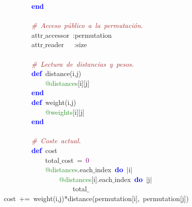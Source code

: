 \mbox{}\ \ \ \ \ \ \ \ \textbf{\textcolor{Blue}{end}} \\
\mbox{} \\
\mbox{}\ \ \ \ \ \ \ \ \textit{\textcolor{Brown}{\#\ Acceso\ público\ a\ la\ permutación.}} \\
\mbox{}\ \ \ \ \ \ \ \ attr$\_$accessor\ \textcolor{BrickRed}{:}permutation\  \\
\mbox{}\ \ \ \ \ \ \ \ attr$\_$reader\ \ \ \textcolor{BrickRed}{:}size \\
\mbox{} \\
\mbox{}\ \ \ \ \ \ \ \ \textit{\textcolor{Brown}{\#\ Lectura\ de\ distancias\ y\ pesos.}} \\
\mbox{}\ \ \ \ \ \ \ \ \textbf{\textcolor{Blue}{def}}\ distance\textcolor{BrickRed}{(}i\textcolor{BrickRed}{,}j\textcolor{BrickRed}{)} \\
\mbox{}\ \ \ \ \ \ \ \ \ \ \ \ \textcolor{ForestGreen}{@distances}\textcolor{BrickRed}{[}i\textcolor{BrickRed}{][}j\textcolor{BrickRed}{]} \\
\mbox{}\ \ \ \ \ \ \ \ \textbf{\textcolor{Blue}{end}} \\
\mbox{}\ \ \ \ \ \ \ \ \textbf{\textcolor{Blue}{def}}\ weight\textcolor{BrickRed}{(}i\textcolor{BrickRed}{,}j\textcolor{BrickRed}{)} \\
\mbox{}\ \ \ \ \ \ \ \ \ \ \ \ \textcolor{ForestGreen}{@weights}\textcolor{BrickRed}{[}i\textcolor{BrickRed}{][}j\textcolor{BrickRed}{]} \\
\mbox{}\ \ \ \ \ \ \ \ \textbf{\textcolor{Blue}{end}} \\
\mbox{} \\
\mbox{}\ \ \ \ \ \ \ \ \textit{\textcolor{Brown}{\#\ Coste\ actual.}} \\
\mbox{}\ \ \ \ \ \ \ \ \textbf{\textcolor{Blue}{def}}\ cost \\
\mbox{}\ \ \ \ \ \ \ \ \ \ \ \ total$\_$cost\ \textcolor{BrickRed}{=}\ \textcolor{Purple}{0} \\
\mbox{}\ \ \ \ \ \ \ \ \ \ \ \ \textcolor{ForestGreen}{@distances}\textcolor{BrickRed}{.}each$\_$index\ \textbf{\textcolor{Blue}{do}}\ \textcolor{BrickRed}{$|$}i\textcolor{BrickRed}{$|$} \\
\mbox{}\ \ \ \ \ \ \ \ \ \ \ \ \ \ \ \ \textcolor{ForestGreen}{@distances}\textcolor{BrickRed}{[}i\textcolor{BrickRed}{].}each$\_$index\ \textbf{\textcolor{Blue}{do}}\ \textcolor{BrickRed}{$|$}j\textcolor{BrickRed}{$|$} \\
\mbox{}\ \ \ \ \ \ \ \ \ \ \ \ \ \ \ \ \ \ \ \ total$\_$cost\ \textcolor{BrickRed}{+=}\ weight\textcolor{BrickRed}{(}i\textcolor{BrickRed}{,}j\textcolor{BrickRed}{)*}distance\textcolor{BrickRed}{(}permutation\textcolor{BrickRed}{[}i\textcolor{BrickRed}{],}\ permutation\textcolor{BrickRed}{[}j\textcolor{BrickRed}{])} \\
